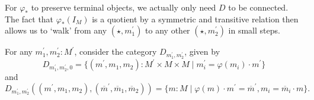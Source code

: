 \begin{remark}
  For $ \varphi_* $ to preserve terminal objects, we actually only need $ D $ to be connected. The fact that $ \varphi_*(I_M) $ is a quotient by a symmetric and transitive relation then allows us to `walk' from any $ (\star, m^\prime_1) $ to any other $ (\star, m^\prime_2) $ in small steps.
\end{remark}

For any $ m^\prime_1, m^\prime_2: M^\prime $, consider the category $ D_{m^\prime_1, m^\prime_2} $, given by
\[ D_{m^\prime_1, m^\prime_2, 0} = \{ (m^\prime, m_1, m_2): M^\prime \times M \times M \mid m_i^\prime = \varphi(m_i) \cdot m^\prime \} \]
and
\[ D_{m^\prime_1, m^\prime_2}((m^\prime, m_1, m_2), (\overline m^\prime, \overline m_1, \overline m_2)) = \{ m: M \mid \varphi(m) \cdot m^\prime = \overline m^\prime, m_i = \overline m_i \cdot m \}. \]

